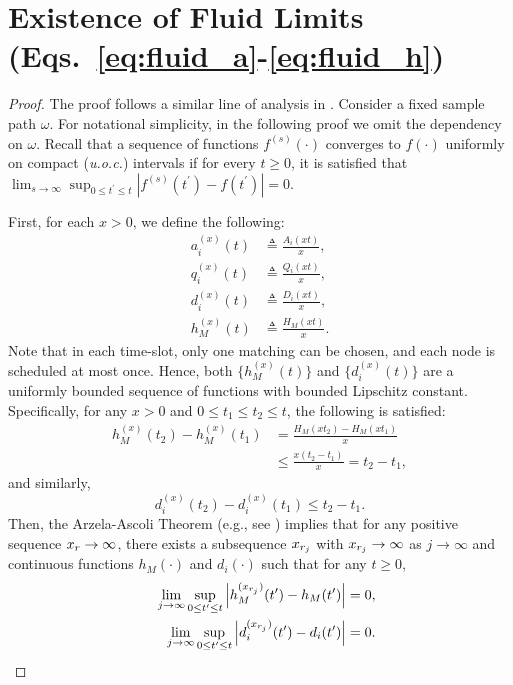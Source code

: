 \documentclass[10pt,journal,compsoc]{IEEEtran}
\begin{document}
\section{Existence of Fluid Limits (Eqs.~\eqref{eq:fluid_a}-\eqref{eq:fluid_h})} \label{sec:fluid}
\begin{proof}
The proof follows a similar line of analysis in \cite{dai00}. Consider a fixed sample path $\omega$. 
For notational simplicity, in the following proof we omit the dependency on $\omega$.
Recall that a sequence of functions $f^{(s)}(\cdot)$ converges to $f(\cdot)$ uniformly 
on compact (\emph{u.o.c.}) intervals if for every $t \ge 0$, it is satisfied that 
$\lim_{s \rightarrow \infty} \sup_{0 \le t^{\prime} \le t} | f^{(s)}(t^{\prime}) - f(t^{\prime}) | = 0$.

First, for each $x>0$, we define the following:
\[
\begin{split}
a_i^{(x)}(t) &\triangleq \frac{A_i(xt)}{x}, \\
q_i^{(x)}(t) &\triangleq \frac{Q_i(xt)}{x}, \\
d_i^{(x)}(t) &\triangleq \frac{D_i(xt)}{x}, \\
h_M^{(x)}(t) &\triangleq \frac{H_M(xt)}{x}.
\end{split}
\]
Note that in each time-slot, only one matching can be chosen, and each node is scheduled at
most once. Hence, both $\{h_M^{(x)}(t)\}$ and $\{d_i^{(x)}(t)\}$ are a uniformly bounded sequence 
of functions with bounded Lipschitz constant. Specifically, for any $x>0$ and $0 \le t_1 \le t_2 \le t$, 
the following is satisfied:
\[
\begin{split}
h_M^{(x)}(t_2) - h_M^{(x)}(t_1) &= \frac{H_M(xt_2) - H_M(xt_1)}{x} \\
& \le \frac{x(t_2 - t_1)}{x} = t_2 - t_1, 
\end{split}
\]
and similarly,
\[
d_i^{(x)}(t_2) - d_i^{(x)}(t_1) \le t_2 - t_1.
\]
Then, the Arzela-Ascoli Theorem (e.g., see \cite{resnick13}) implies that for any positive sequence ${x_r} \rightarrow \infty$, 
there exists a subsequence ${x_{r_j}}$ with ${x_{r_j}} \rightarrow \infty$ as $j \rightarrow \infty$ and continuous
functions $h_M(\cdot)$ and $d_i(\cdot)$ such that for any $t \ge 0$,
\begin{eqnarray}
&& \lim_{j \rightarrow \infty} \sup_{0 \le t^{\prime} \le t} \left | h_M^{(\xrj)}(t^{\prime}) - h_M(t^{\prime}) \right | = 0, \label{eq:uoc_h} \\
&& \lim_{j \rightarrow \infty} \sup_{0 \le t^{\prime} \le t} \left | d_i^{(\xrj)}(t^{\prime}) - d_i(t^{\prime}) \right | = 0. \label{eq:uoc_d}

\end{eqnarray}
\end{proof}
\end{document}
